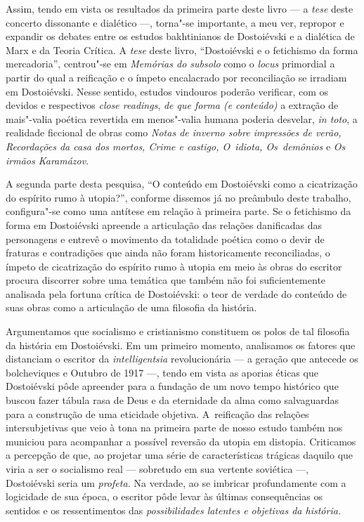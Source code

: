 Assim, tendo em vista os resultados da primeira parte deste livro --- a
\emph{tese} deste concerto dissonante e dialético ---, torna"-se
importante, a meu ver, repropor e expandir os debates entre os estudos
bakhtinianos de Dostoiévski e a dialética de Marx e da Teoria Crítica. A
\emph{tese} deste livro, ``Dostoiévski e o fetichismo da forma
mercadoria'', centrou"-se em \emph{Memórias do subsolo} como o
\emph{locus} primordial a partir do qual a reificação e o ímpeto
encalacrado por reconciliação se irradiam em Dostoiévski. Nesse sentido,
estudos vindouros poderão verificar, com os devidos e respectivos
\emph{close readings}, \emph{de que forma (e conteúdo)} a extração de
mais"-valia poética revertida em menos"-valia humana poderia desvelar,
\emph{in toto}, a realidade ficcional de obras como \emph{Notas de
inverno sobre impressões de verão, Recordações da casa dos mortos, Crime
e castigo, O~idiota, Os~demônios} e \emph{Os irmãos Karamázov}.

A segunda parte desta pesquisa, ``O conteúdo em Dostoiévski como a
cicatrização do espírito rumo à utopia?'', conforme dissemos já no
preâmbulo deste trabalho, configura"-se como uma antítese em relação à
primeira parte. Se o fetichismo da forma em Dostoiévski apreende a
articulação das relações danificadas das personagens e entrevê o
movimento da totalidade poética como o devir de fraturas e contradições
que ainda não foram historicamente reconciliadas, o ímpeto de
cicatrização do espírito rumo à utopia em meio às obras do escritor
procura discorrer sobre uma temática que também não foi suficientemente
analisada pela fortuna crítica de Dostoiévski: o teor de verdade do
conteúdo de suas obras como a articulação de uma filosofia da história.

Argumentamos que socialismo e cristianismo constituem os polos de tal
filosofia da história em Dostoiévski. Em um primeiro momento, analisamos
os fatores que distanciam o escritor da \emph{intelligentsia}
revolucionária --- a geração que antecede os bolcheviques e Outubro de
1917 ---, tendo em vista as aporias éticas que Dostoiévski pôde apreender
para a fundação de um novo tempo histórico que buscou fazer tábula rasa
de Deus e da eternidade da alma como salvaguardas para a construção de
uma eticidade objetiva. A~reificação das relações intersubjetivas que
veio à tona na primeira parte de nosso estudo também nos municiou para
acompanhar a possível reversão da utopia em distopia. Criticamos a
percepção de que, ao projetar uma série de características trágicas
daquilo que viria a ser o socialismo real --- sobretudo em sua vertente
soviética ---, Dostoiévski seria um \emph{profeta.} Na verdade, ao se
imbricar profundamente com a logicidade de sua época, o escritor pôde
levar às últimas consequências os sentidos e os ressentimentos das
\emph{possibilidades latentes e objetivas da história. }

